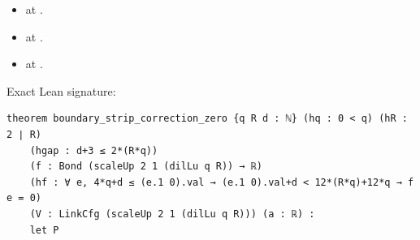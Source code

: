 \begin{theorem}[bp-065]
\begin{itemize}
\item \texttt{} at \texttt{}.
\item \texttt{} at \texttt{}.
\item \texttt{} at \texttt{}.
\end{itemize}
\par Exact Lean signature:
\begin{verbatim}
theorem boundary_strip_correction_zero {q R d : ℕ} (hq : 0 < q) (hR : 2 ∣ R)
    (hgap : d+3 ≤ 2*(R*q))
    (f : Bond (scaleUp 2 1 (dilLu q R)) → ℝ)
    (hf : ∀ e, 4*q+d ≤ (e.1 0).val → (e.1 0).val+d < 12*(R*q)+12*q → f e = 0)
    (V : LinkCfg (scaleUp 2 1 (dilLu q R))) (a : ℝ) :
    let P
\end{verbatim}
\end{theorem}


